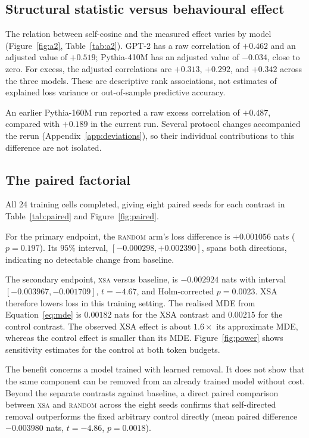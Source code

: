 \documentclass{article} %
\begin{document}
\subsection{Structural statistic versus behavioural effect}
\label{sec:a2}

The relation between self-cosine and the measured effect varies by model
(Figure~\ref{fig:a2}, Table~\ref{tab:a2}). GPT-2 has a raw correlation of
$+0.462$ and an adjusted value of $+0.519$; Pythia-410M has an adjusted
value of $-0.034$, close to zero. For excess, the adjusted correlations are
$+0.313$, $+0.292$, and $+0.342$ across the three models. These are
descriptive rank associations, not estimates of explained loss variance or
out-of-sample predictive accuracy.

An earlier Pythia-160M run reported a raw excess correlation of $+0.487$,
compared with $+0.189$ in the current run. Several protocol changes
accompanied the rerun (Appendix~\ref{app:deviations}), so their individual
contributions to this difference are not isolated.

\subsection{The paired factorial}
\label{sec:paired}

All 24 training cells completed, giving eight paired seeds for each contrast
in Table~\ref{tab:paired} and Figure~\ref{fig:paired}.

For the primary endpoint, the \textsc{random} arm's loss difference is
$+0.001056$ nats ($p = 0.197$). Its $95\%$ interval,
$[-0.000298, +0.002390]$, spans both directions, indicating no detectable
change from baseline.

The secondary endpoint, \textsc{xsa} versus baseline, is $-0.002924$ nats with
interval $[-0.003967, -0.001709]$, $t = -4.67$, and Holm-corrected $p =
0.0023$. XSA therefore lowers loss in this training setting. The realised MDE from
Equation~\ref{eq:mde} is $0.00182$ nats for the XSA contrast and $0.00215$ for
the control contrast. The observed XSA effect is about $1.6\times$ its
approximate MDE, whereas the control effect is smaller than its MDE.
Figure~\ref{fig:power} shows sensitivity estimates for the control at both
token budgets.

The benefit concerns a model trained with learned removal. It does not show
that the same component can be removed from an already trained model without
cost. Beyond the separate contrasts against baseline, a direct paired comparison
between \textsc{xsa} and \textsc{random} across the eight seeds confirms that
self-directed removal outperforms the fixed arbitrary control directly
(mean paired difference $-0.003980$ nats, $t = -4.86$, $p = 0.0018$).
\end{document}
